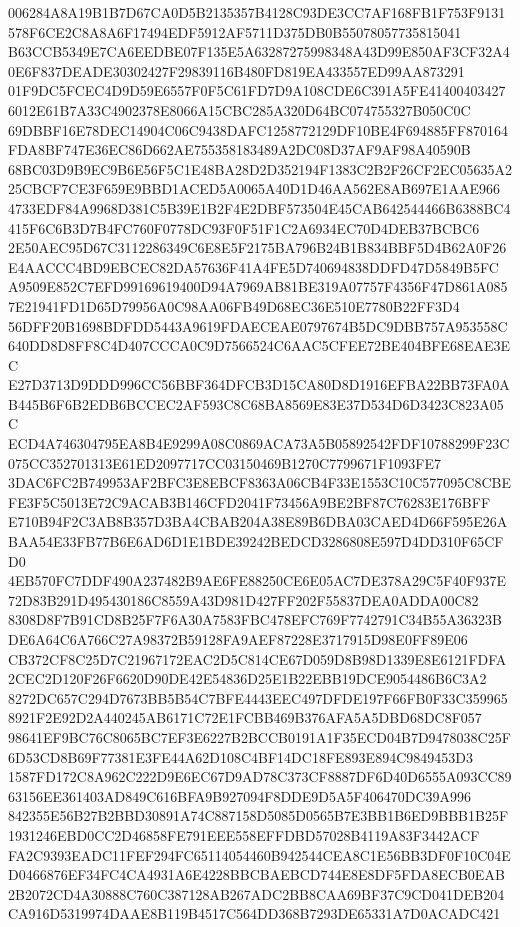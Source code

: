 \documentclass[UTF8,fontset=fandol,zihao=-4,a4paper]{ctexart}
\begin{document}
{{006284A8A19B1B7D67CA0D5B2135357B4128C93DE3CC7AF168FB1F753F9131578F6CE2C8A8A6F17494EDF5912AF5711D375DB0B55078057735815041
B63CCB5349E7CA6EEDBE07F135E5A63287275998348A43D99E850AF3CF32A40E6F837DEADE30302427F29839116B480FD819EA433557ED99AA873291
01F9DC5FCEC4D9D59E6557F0F5C61FD7D9A108CDE6C391A5FE414004034276012E61B7A33C4902378E8066A15CBC285A320D64BC074755327B050C0C
69DBBF16E78DEC14904C06C9438DAFC1258772129DF10BE4F694885FF870164FDA8BF747E36EC86D662AE755358183489A2DC08D37AF9AF98A40590B
68BC03D9B9EC9B6E56F5C1E48BA28D2D352194F1383C2B2F26CF2EC05635A225CBCF7CE3F659E9BBD1ACED5A0065A40D1D46AA562E8AB697E1AAE966
4733EDF84A9968D381C5B39E1B2F4E2DBF573504E45CAB642544466B6388BC4415F6C6B3D7B4FC760F0778DC93F0F51F1C2A6934EC70D4DEB37BCBC6
2E50AEC95D67C3112286349C6E8E5F2175BA796B24B1B834BBF5D4B62A0F26E4AACCC4BD9EBCEC82DA57636F41A4FE5D740694838DDFD47D5849B5FC
A9509E852C7EFD99169619400D94A7969AB81BE319A07757F4356F47D861A0857E21941FD1D65D79956A0C98AA06FB49D68EC36E510E7780B22FF3D4
56DFF20B1698BDFDD5443A9619FDAECEAE0797674B5DC9DBB757A953558C640DD8D8FF8C4D407CCCA0C9D7566524C6AAC5CFEE72BE404BFE68EAE3EC
E27D3713D9DDD996CC56BBF364DFCB3D15CA80D8D1916EFBA22BB73FA0AB445B6F6B2EDB6BCCEC2AF593C8C68BA8569E83E37D534D6D3423C823A05C
ECD4A746304795EA8B4E9299A08C0869ACA73A5B05892542FDF10788299F23C075CC352701313E61ED2097717CC03150469B1270C7799671F1093FE7
3DAC6FC2B749953AF2BFC3E8EBCF8363A06CB4F33E1553C10C577095C8CBEFE3F5C5013E72C9ACAB3B146CFD2041F73456A9BE2BF87C76283E176BFF
E710B94F2C3AB8B357D3BA4CBAB204A38E89B6DBA03CAED4D66F595E26ABAA54E33FB77B6E6AD6D1E1BDE39242BEDCD3286808E597D4DD310F65CFD0
4EB570FC7DDF490A237482B9AE6FE88250CE6E05AC7DE378A29C5F40F937E72D83B291D495430186C8559A43D981D427FF202F55837DEA0ADDA00C82
8308D8F7B91CD8B25F7F6A30A7583FBC478EFC769F7742791C34B55A36323BDE6A64C6A766C27A98372B59128FA9AEF87228E3717915D98E0FF89E06
CB372CF8C25D7C21967172EAC2D5C814CE67D059D8B98D1339E8E6121FDFA2CEC2D120F26F6620D90DE42E54836D25E1B22EBB19DCE9054486B6C3A2
8272DC657C294D7673BB5B54C7BFE4443EEC497DFDE197F66FB0F33C3599658921F2E92D2A440245AB6171C72E1FCBB469B376AFA5A5DBD68DC8F057
98641EF9BC76C8065BC7EF3E6227B2BCCB0191A1F35ECD04B7D9478038C25F6D53CD8B69F77381E3FE44A62D108C4BF14DC18FE893E894C9849453D3
1587FD172C8A962C222D9E6EC67D9AD78C373CF8887DF6D40D6555A093CC8963156EE361403AD849C616BFA9B927094F8DDE9D5A5F406470DC39A996
842355E56B27B2BBD30891A74C887158D5085D0565B7E3BB1B6ED9BBB1B25F1931246EBD0CC2D46858FE791EEE558EFFDBD57028B4119A83F3442ACF
FA2C9393EADC11FEF294FC65114054460B942544CEA8C1E56BB3DF0F10C04ED0466876EF34FC4CA4931A6E4228BBCBAEBCD744E8E8DF5FDA8ECB0EAB
2B2072CD4A30888C760C387128AB267ADC2BB8CAA69BF37C9CD041DEB204CA916D5319974DAAE8B119B4517C564DD368B7293DE65331A7D0ACADC421
}}
\end{document}
